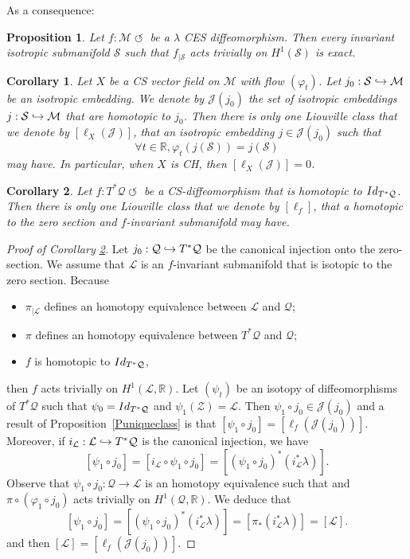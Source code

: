 \documentclass[11pt]{article}
\numberwithin{equation}{section}
\numberwithin{figure}{section}
\numberwithin{table}{section}
\def\hto{\mathrel{\lhook\joinrel\to}}
\providecommand{\righttoleftarrow}{\mathrel{\circlearrowleft}}
\newtheorem{corollary}{Corollary}
\newtheorem{proposition}{Proposition}
\theoremstyle{definition}
\def\R{\mathbb{R}}
\def\cL{{\mathcal L}}
\def\cJ{{\mathcal J}}
\def\cM{{\mathcal M}}
\def\cQ{{\mathcal Q}}
\def\cS{{\mathcal S}}
\def\cZ{{\mathcal Z}}
\begin{document}
As a consequence:

\begin{proposition} \label{Pinvalagrexact}
Let $f:\cM \righttoleftarrow$ be a $\lambda$ CES diffeomorphism. Then every invariant isotropic submanifold { $\cS$ such that $f_{|\cS}$ acts trivially on $H^1(\cS)$} is exact.
\end{proposition}

\begin{corollary}\label{Cuniqueclassflow}
Let $X$ be a CS vector field on $\cM$ with flow $(\varphi_t)$. Let $ j_0:\cS\hto\cM$ be an isotropic embedding. We denote by $\cJ(j_0)$ the set of isotropic embeddings $ j:\cS\hto\cM$ that are homotopic to $j_0$. Then there is only one Liouville class that we denote by $[\ell_X(\cJ)]$, that an isotropic embedding $j\in\cJ(j_0)$ such that
\[
\forall t\in\R, \varphi_t(j(\cS))=j(\cS)
\]
may have.
In particular, when $X$ is CH, then $[\ell_X(\cJ)]=0$.
\end{corollary}

\begin{corollary}\label{Cuniqueclasscotangent}
Let $f: T^*\cQ \righttoleftarrow$ be a CS-diffeomorphism that is homotopic to ${\rm Id}_{T^*\cQ}$. Then there is only one Liouville class that we denote by $[\ell_f]$, that a homotopic to the zero section and $f$-invariant submanifold may have.
\end{corollary}

\begin{proof}[Proof of Corollary \ref{Cuniqueclasscotangent}] Let $j_0: \cQ{}\hto T^*\cQ$ be the canonical injection onto the zero-section.
We assume that $\cL$ is an $f$-invariant submanifold that is isotopic to the zero section.
Because
\begin{itemize}
\item
$\pi_{|\cL}$ defines an homotopy equivalence between $\cL$ and $\cQ$;
\item
$\pi$ defines an homotopy equivalence between $T^*\cQ$ and $\cQ$;
\item
$f$ is homotopic to ${\rm Id}_{T^*\cQ}$,
\end{itemize}
then $f$ acts trivially on $H^1(\cL,\R)$.
Let $(\psi_t)$ be an isotopy of diffeomorphisms of $T^*\cQ$ such that $\psi_0={\rm Id}_{T^*\cQ}$ and $\psi_1(\cZ)=\cL$. Then $\psi_1\circ j_0\in \cJ(j_0)$ and
a result of Proposition~\ref{Puniqueclass} is that $[\psi_1\circ j_0]=[\ell_f(\cJ(j_0))]$.
Moreover, if $i_\cL:\cL\hto T^*\cQ$ is the canonical injection, we have
\[
[\psi_1\circ j_0]=[i_\cL\circ\psi_1\circ j_0]=[(\psi_1\circ j_0)^*(i_\cL^*\lambda)].
\]
Observe that $\psi_1\circ j_0:\cQ\to \cL$ is an homotopy equivalence such that and $\pi\circ (\varphi_1\circ j_0)$ acts trivially on $H^1(\cQ, \R)$. We deduce that
\[
[\psi_1\circ j_0]=[(\psi_1\circ j_0)^*(i_\cL^*\lambda)]=[\pi_*(i_\cL^*\lambda)]=[\cL].
\]
and then $[\cL]=[\ell_f(\cJ(j_0))]$.
\end{proof}
\end{document}
